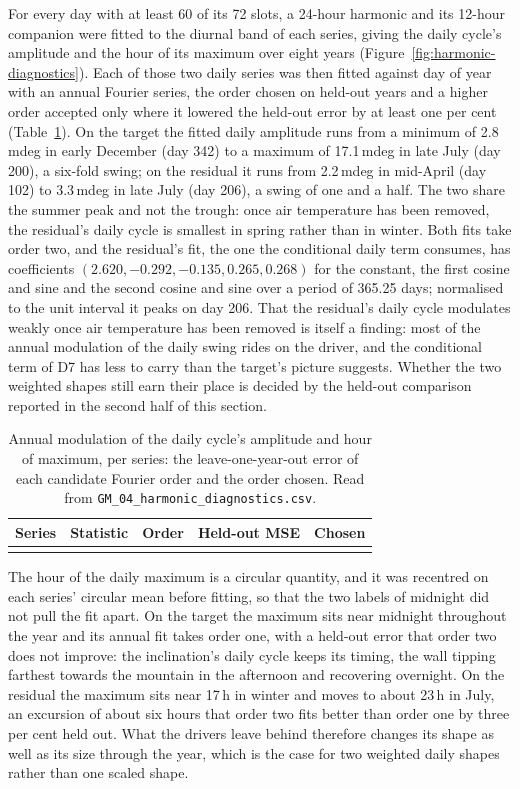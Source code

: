 \documentclass[11pt,a4paper]{article}
\begin{document}
For every day with at least 60 of its 72 slots, a 24-hour harmonic and its
12-hour companion were fitted to the diurnal band of each series, giving the
daily cycle's amplitude and the hour of its maximum over eight years
(Figure~\ref{fig:harmonic-diagnostics}). Each of those two daily series was
then fitted against day of year with an annual Fourier series, the order
chosen on held-out years and a higher order accepted only where it lowered
the held-out error by at least one per cent
(Table~\ref{tab:annual-modulation}). On the target the fitted daily amplitude
runs from a minimum of 2.8\,mdeg in early December (day 342) to a maximum of
17.1\,mdeg in late July (day 200), a six-fold swing; on the residual it runs
from 2.2\,mdeg in mid-April (day 102) to 3.3\,mdeg in late July (day 206), a
swing of one and a half. The two share the summer peak and not the trough:
once air temperature has been removed, the residual's daily cycle is smallest
in spring rather than in winter. Both fits take order two, and the residual's
fit, the one the conditional daily
term consumes, has coefficients $(2.620, -0.292, -0.135, 0.265, 0.268)$ for
the constant, the first cosine and sine and the second cosine and sine over a
period of 365.25 days; normalised to the unit interval it peaks on day 206.
That the residual's daily cycle modulates weakly once air temperature has
been removed is itself a finding: most of the annual modulation of the daily
swing rides on the driver, and the conditional term of D7 has less to carry
than the target's picture suggests. Whether the two weighted shapes still
earn their place is decided by the held-out comparison reported in the second
half of this section.

\begin{table}[H]
\centering
\caption{Annual modulation of the daily cycle's amplitude and hour of maximum,
per series: the leave-one-year-out error of each candidate Fourier order and
the order chosen. Read from \texttt{GM\_04\_harmonic\_diagnostics.csv}.}
\label{tab:annual-modulation}
\begin{tabular}{llrrl}
\toprule
Series & Statistic & Order & Held-out MSE & Chosen \\
\midrule
\\
\bottomrule
\end{tabular}
\end{table}

The hour of the daily maximum is a circular quantity, and it was recentred on
each series' circular mean before fitting, so that the two labels of midnight
did not pull the fit apart. On the target the maximum sits near midnight
throughout the year and its annual fit takes order one, with a held-out error
that order two does not improve: the inclination's daily cycle keeps its
timing, the wall tipping farthest towards the mountain in the afternoon and
recovering overnight. On the residual the maximum sits near 17\,h in winter
and moves to about 23\,h in July, an excursion of about six hours that order
two fits better than order one by three per cent held out. What the drivers
leave behind therefore changes its shape as well as its size through the year,
which is the case for two weighted daily shapes rather than one scaled shape.
\end{document}
